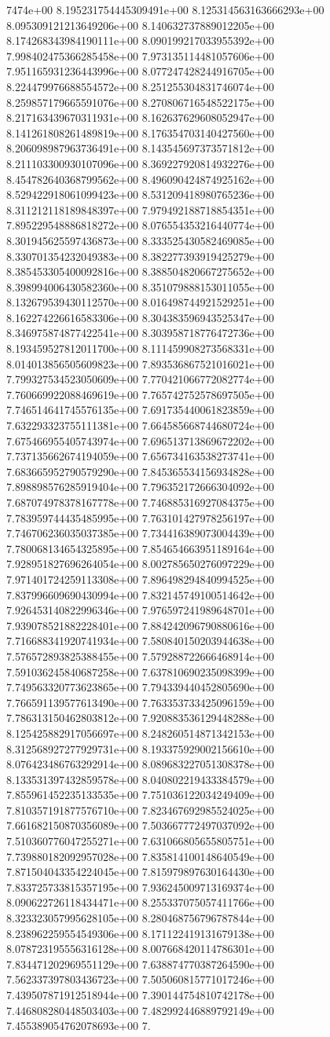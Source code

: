 7474e+00	8.195231754445309491e+00	8.125314563163666293e+00	8.095309121213649206e+00	8.140632737889012205e+00	8.174268343984190111e+00	8.090199217033955392e+00	7.998402475366285458e+00	7.973135114481057606e+00	7.951165931236443996e+00	8.077247428244916705e+00	8.224479976688554572e+00	8.251255304831746074e+00	8.259857179665591076e+00	8.270806716548522175e+00	8.217163439670311931e+00	8.162637629608052947e+00	8.141261808261489819e+00	8.176354703140427560e+00	8.206098987963736491e+00	8.143545697373571812e+00	8.211103300930107096e+00	8.369227920814932276e+00	8.454782640368799562e+00	8.496090424874925162e+00	8.529422918061099423e+00	8.531209418980765236e+00	8.311212118189848397e+00	7.979492188718854351e+00	7.895229548886818272e+00	8.076554353216440774e+00	8.301945625597436873e+00	8.333525430582469085e+00	8.330701354232049383e+00	8.382277393919425279e+00	8.385453305400092816e+00	8.388504820667275652e+00	8.398994006430582360e+00	8.351079888153011055e+00	8.132679539430112570e+00	8.016498744921529251e+00	8.162274226616583306e+00	8.304383596943525347e+00	8.346975874877422541e+00	8.303958718776472736e+00	8.193459527812011700e+00	8.111459908273568331e+00	8.014013856505609823e+00	7.893536867521016021e+00	7.799327534523050609e+00	7.770421066772082774e+00	7.760669922088469619e+00	7.765742752578697505e+00	7.746514641745576135e+00	7.691735440061823859e+00	7.632293323755111381e+00	7.664585668744680724e+00	7.675466955405743974e+00	7.696513713869672202e+00	7.737135662674194059e+00	7.656734163538273741e+00	7.683665952790579290e+00	7.845365534156934828e+00	7.898898576285919404e+00	7.796352172666304092e+00	7.687074978378167778e+00	7.746885316927084375e+00	7.783959744435485995e+00	7.763101427978256197e+00	7.746706236035037385e+00	7.734416389073004439e+00	7.780068134654325895e+00	7.854654663951189164e+00	7.928951827696264054e+00	8.002785650276097229e+00	7.971401724259113308e+00	7.896498294840994525e+00	7.837996609690430994e+00	7.832145749100514642e+00	7.926453140822996346e+00	7.976597241989648701e+00	7.939078521882228401e+00	7.884242096790880616e+00	7.716688341920741934e+00	7.580840150203944638e+00	7.576572893825388455e+00	7.579288722666468914e+00	7.591036245840687258e+00	7.637810690235098399e+00	7.749563320773623865e+00	7.794339440452805690e+00	7.766591139577613490e+00	7.763353733425096159e+00	7.786313150462803812e+00	7.920883536129448288e+00	8.125425882917056697e+00	8.248260514871342153e+00	8.312568927277929731e+00	8.193375929002156610e+00	8.076423486763292914e+00	8.089683227051308378e+00	8.133531397432859578e+00	8.040802219433384579e+00	7.855961452235133535e+00	7.751036122034249409e+00	7.810357191877576710e+00	7.823467692985524025e+00	7.661682150870356089e+00	7.503667772497037092e+00	7.510360776047255271e+00	7.631066805655805751e+00	7.739880182092957028e+00	7.835814100148640549e+00	7.871504043354224045e+00	7.815979897630164430e+00	7.833725733815357195e+00	7.936245009713169374e+00	8.090622726118434471e+00	8.255337075057411766e+00	8.323323057995628105e+00	8.280468756796787844e+00	8.238962259554549306e+00	8.171122419131679138e+00	8.078723195556316128e+00	8.007668420114786301e+00	7.834471202969551129e+00	7.638874770387264590e+00	7.562337397803436723e+00	7.505060815771017246e+00	7.439507871912518944e+00	7.390144754810742178e+00	7.446808280448503403e+00	7.482992446889792149e+00	7.455389054762078693e+00	7.